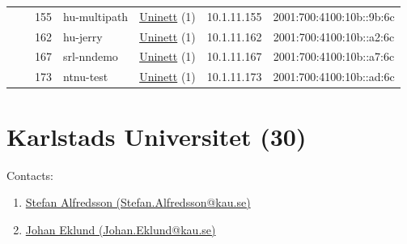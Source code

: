 \begin{small}
\begin{center}
\begin{longtable}{|c|c|c|c|c|c|c|c|}
  &  & \tiny{155} & \multicolumn{1}{|l|}{\tiny{hu-multipath}} & \multicolumn{2}{|c|}{\tiny{\href{https://www.uninett.no}{Uninett} (1)}} & \tiny{10.1.11.155} & \tiny{2001:700:4100:10b::9b:6c} \\* \cline{3-3}\cline{4-4}\cline{5-5}\cline{6-6}\cline{7-7}\cline{8-8}
  &  & \tiny{162} & \multicolumn{1}{|l|}{\tiny{hu-jerry}} & \multicolumn{2}{|c|}{\tiny{\href{https://www.uninett.no}{Uninett} (1)}} & \tiny{10.1.11.162} & \tiny{2001:700:4100:10b::a2:6c} \\* \cline{3-3}\cline{4-4}\cline{5-5}\cline{6-6}\cline{7-7}\cline{8-8}
  &  & \tiny{167} & \multicolumn{1}{|l|}{\tiny{srl-nndemo}} & \multicolumn{2}{|c|}{\tiny{\href{https://www.uninett.no}{Uninett} (1)}} & \tiny{10.1.11.167} & \tiny{2001:700:4100:10b::a7:6c} \\* \cline{3-3}\cline{4-4}\cline{5-5}\cline{6-6}\cline{7-7}\cline{8-8}
  &  & \tiny{173} & \multicolumn{1}{|l|}{\tiny{ntnu-test}} & \multicolumn{2}{|c|}{\tiny{\href{https://www.uninett.no}{Uninett} (1)}} & \tiny{10.1.11.173} & \tiny{2001:700:4100:10b::ad:6c} \\ \hline
\end{longtable}
\end{center}
\end{small}



\section{Karlstads Universitet (30)}
\label{sec:KAU}

Contacts:
\begin{enumerate}
 \item {}\href{mailto:Stefan.Alfredsson@kau.se}{Stefan Alfredsson (Stefan.Alfredsson@kau.se)}
 \item {}\href{mailto:Johan.Eklund@kau.se}{Johan Eklund (Johan.Eklund@kau.se)}
\end{enumerate}

